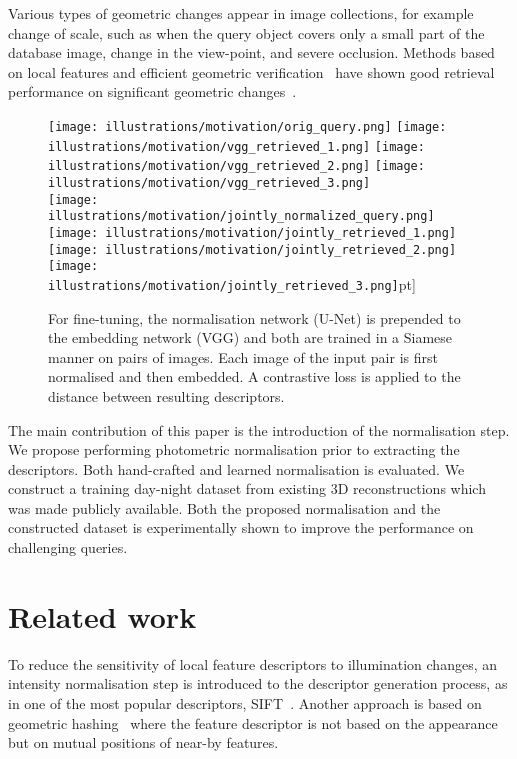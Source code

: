 Various types of geometric changes appear in image collections, for example change of scale, such as when the query object covers only a small part of the database image, change in the view-point, and severe occlusion. Methods based on local features and efficient geometric verification~\cite{Stewenius-ECCV12} have shown good retrieval performance on significant geometric changes~\cite{Mikulik-SISAP13,Mikulik-ACCV14}.

\begin{figure}[t] \centering
    \texttt{[image: illustrations/motivation/orig\_query.png]}
    \hspace{0.6cm}
    \texttt{[image: illustrations/motivation/vgg\_retrieved\_1.png]}
    \texttt{[image: illustrations/motivation/vgg\_retrieved\_2.png]}
    \texttt{[image: illustrations/motivation/vgg\_retrieved\_3.png]}
\\
    \texttt{[image: illustrations/motivation/jointly\_normalized\_query.png]} \hspace{0.6cm}
    \texttt{[image: illustrations/motivation/jointly\_retrieved\_1.png]}
    \texttt{[image: illustrations/motivation/jointly\_retrieved\_2.png]}
    \texttt{[image: illustrations/motivation/jointly\_retrieved\_3.png]}\3pt]

    \caption{For fine-tuning, the normalisation network (U-Net) is prepended to the embedding network (VGG) and both are trained in a Siamese manner on pairs of images. Each image of the input pair is first normalised and then embedded. A contrastive loss is applied to the distance between resulting descriptors.}
\label{fig:finetune}
\end{figure}
 
The main contribution of this paper is the introduction of the normalisation step. We propose performing photometric normalisation prior to extracting the descriptors. Both hand-crafted and learned normalisation is evaluated. We construct a training day-night dataset from existing 3D reconstructions which was made publicly available. Both the proposed normalisation and the constructed dataset is experimentally shown to improve the performance on challenging queries.


\section{Related work}

To reduce the sensitivity of local feature descriptors to illumination changes, an intensity normalisation step is introduced to the descriptor generation process, as in one of the most popular descriptors, SIFT~\cite{Lowe-IJCV04}. Another approach is based on geometric hashing~\cite{Lamdan-ICCV88,Chum-CVPR06} where the feature descriptor is not based on the appearance but on mutual positions of near-by features. 

